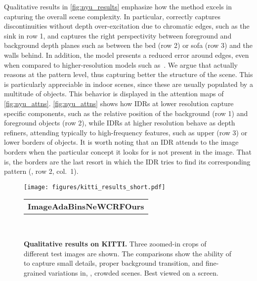 Qualitative results in \cref{fig:nyu_results} emphasize how the method excels in capturing the overall scene complexity. In particular, \ourmodel correctly captures discontinuities without depth over-excitation due to chromatic edges, such as the sink in row 1, and captures the right perspectivity between foreground and background depth planes such as between the bed (row 2) or sofa (row 3) and the walls behind. In addition, the model presents a reduced error around edges, even when compared to higher-resolution models such as~\cite{Bhat2020}. We argue that \ourmodel actually reasons at the pattern level, thus capturing better the structure of the scene. This is particularly appreciable in indoor scenes, since these are usually populated by a multitude of objects. This behavior is displayed in the attention maps of \cref{fig:nyu_attns}. \cref{fig:nyu_attns} shows how IDRs at lower resolution capture specific components, such as the relative position of the background (row 1) and foreground objects (row 2), while IDRs at higher resolution behave as depth refiners, attending typically to high-frequency features, such as upper (row 3) or lower borders of objects. It is worth noting that an IDR attends to the image borders when the particular concept it looks for is not present in the image. That is, the borders are the last resort in which the IDR tries to find its corresponding pattern (\eg, row 2, col.~1).

\begin{figure*}[]
    \centering
    \texttt{[image: figures/kitti\_results\_short.pdf]}\\
    \footnotesize
    \begin{tabularx}{\textwidth}{l}
        \hspace{0.085\textwidth}\textbf{Image}\hspace{0.2\textwidth}\textbf{AdaBins}\cite{Bhat2020}\hspace{0.16\textwidth}\textbf{NeWCRF}\cite{Yuan2022}\hspace{0.18\textwidth}\textbf{Ours}
    \end{tabularx}\\
    \vspace{-5pt}
    \caption{\textbf{Qualitative results on KITTI.} Three zoomed-in crops of different test images are shown.
The comparisons show the ability of \ourmodel to capture small details, proper background transition, and fine-grained variations in, \eg, crowded scenes. Best viewed on a screen.
}
    \label{fig:kitti_results}
    \vspace{-10pt}
\end{figure*}

